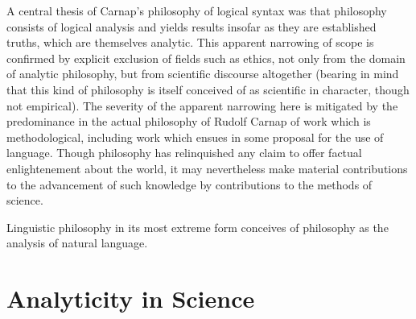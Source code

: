 A central thesis of Carnap's philosophy of logical syntax was that
philosophy consists of logical analysis and yields results insofar as
they are established truths, which are themselves analytic.
This apparent narrowing of scope is confirmed by explicit exclusion of
fields such as ethics, not only from the domain of analytic
philosophy, but from scientific discourse altogether (bearing in mind
that this kind of philosophy is itself conceived of as scientific in
character, though not empirical).
The severity of the apparent narrowing here is mitigated by the
predominance in the actual philosophy of Rudolf Carnap of work which
is methodological, including work which ensues in some proposal for
the use of language.
Though philosophy has relinquished any claim to offer factual
enlightenement about the world, it may nevertheless make material
contributions to the advancement of such knowledge by contributions to
the methods of science.

Linguistic philosophy in its most extreme form conceives of philosophy
as the analysis of natural language.







\section{Analyticity in Science}
